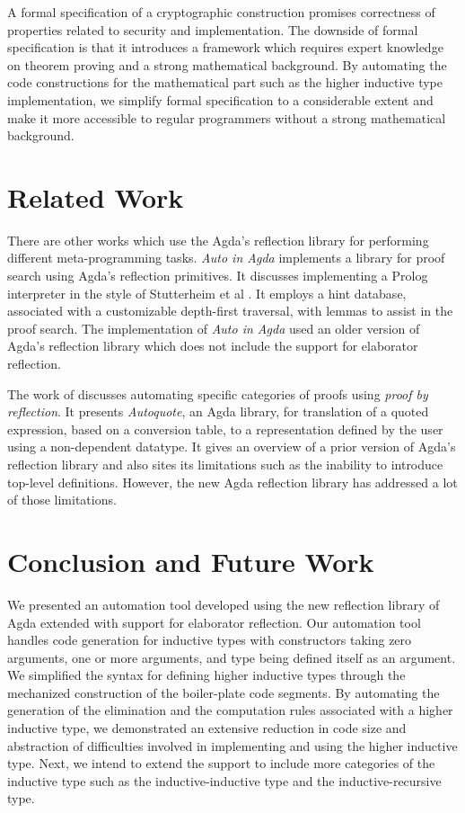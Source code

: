 \documentclass[sigplan,10pt]{acmart}
\begin{document}
A formal specification of a cryptographic construction promises correctness of properties related to security and implementation. The downside of formal specification is that it introduces a framework which requires expert knowledge on theorem proving and a strong mathematical background. By automating the code constructions for the mathematical part such as the higher inductive type implementation, we simplify formal specification to a considerable extent and make it more accessible to regular programmers without a strong mathematical background.

\section{Related Work}

There are other works which use the Agda's reflection library for performing different meta-programming tasks. \emph{Auto in Agda} \cite{Kokke-2015} implements a library for proof search using Agda's reflection primitives. It discusses implementing a Prolog interpreter in the style of Stutterheim et al \cite{Stutterheim-2013}. It employs a hint database, associated with a customizable depth-first traversal, with lemmas to assist in the proof search. The implementation of \emph{Auto in Agda} used an older version of Agda's reflection library which does not include the support for elaborator reflection. 

The work of \cite{Walt-2013} \cite{Walt-2012} discusses automating specific categories of proofs using \emph{proof by reflection}. It presents \emph{Autoquote}, an Agda library, for translation of a quoted expression, based on a conversion table, to a representation defined by the user using a non-dependent datatype. It gives an overview of a prior version of Agda's reflection library and also sites its limitations such as the inability to introduce top-level definitions. However, the new Agda reflection library has addressed a lot of those limitations.

\section{Conclusion and Future Work}

We presented an automation tool developed using the new reflection library of Agda extended with support for elaborator reflection. Our automation tool handles code generation for inductive types with constructors taking zero arguments, one or more arguments, and type being defined itself as an argument. We simplified the syntax for defining higher inductive types through the mechanized construction of the boiler-plate code segments. By automating the generation of the elimination and the computation rules associated with a higher inductive type, we demonstrated an extensive reduction in code size and abstraction of difficulties involved in implementing and using the higher inductive type. Next, we intend to extend the support to include more categories of the inductive type such as the inductive-inductive type and the inductive-recursive type.




\end{document}
